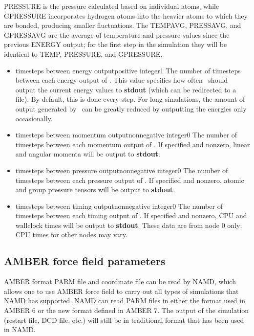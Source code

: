 PRESSURE is the pressure calculated based on individual atoms, while
GPRESSURE incorporates hydrogen atoms into the heavier atoms to which
they are bonded, producing smaller fluctuations.
The TEMPAVG, PRESSAVG, and GPRESSAVG are the average of temperature and
pressure values since the previous ENERGY output; for the first step
in the simulation they will be identical to TEMP, PRESSURE, and GPRESSURE.

\begin{itemize}
\item
{}
{timesteps between energy output}{positive integer}{1}
{
The number of timesteps between each energy output of \NAMD.  
This value
specifies how often \NAMD\ should output the current energy 
values to {\bf stdout} (which can be redirected to a file).  
By default, this is done every step.  
For long simulations, 
the amount of output generated by \NAMD\ can be greatly reduced 
by outputting the energies only occasionally.  
}

\item
{}
{timesteps between momentum output}{nonnegative integer}{0}
{
The number of timesteps between each momentum output of \NAMD.
If specified and nonzero, linear and angular momenta will be
output to {\bf stdout}.
}

\item
{}
{timesteps between pressure output}{nonnegative integer}{0}
{
The number of timesteps between each pressure output of \NAMD.
If specified and nonzero, atomic and group pressure tensors
will be output to {\bf stdout}.
}

\item
{}
{timesteps between timing output}{nonnegative integer}{0}
{
The number of timesteps between each timing output of \NAMD.
If specified and nonzero, CPU and wallclock times will be
output to {\bf stdout}.
These data are from node 0 only; CPU times for other nodes
may vary.
}

\end{itemize}


\subsection{AMBER force field parameters}

AMBER format PARM file and coordinate file can be read by NAMD,
which allows one to use AMBER force field to carry out all types
of simulations that NAMD has supported. NAMD can read PARM files
in either the format used in AMBER 6 or the new format
defined in AMBER 7. The output of
the simulation (restart file, DCD file, etc.) will still be in
traditional format that has been used in NAMD.

